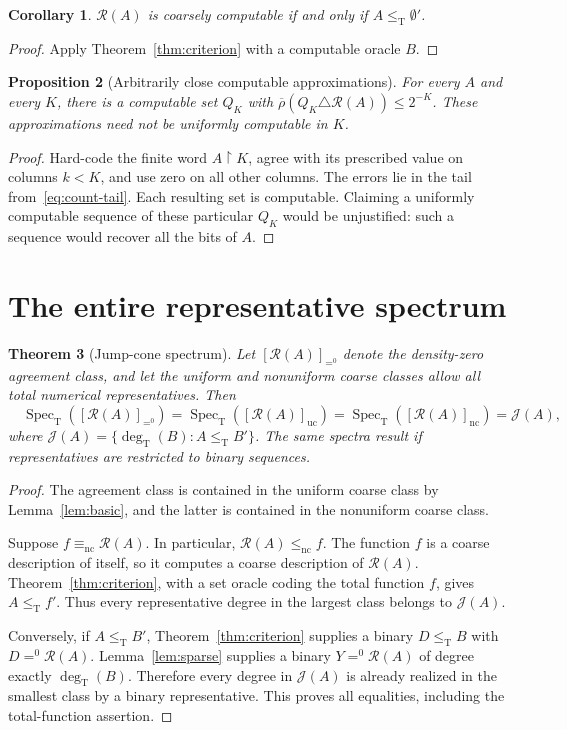 \documentclass[11pt,a4paper]{article}
\newcommand{\leT}{\leq_{\mathrm T}}
\newcommand{\lenc}{\leq_{\mathrm{nc}}}
\newcommand{\eqnc}{\equiv_{\mathrm{nc}}}
\newcommand{\az}{\mathrel{=^{0}}}
\newcommand{\Spec}{\operatorname{Spec}_{\mathrm T}}
\newcommand{\degT}{\operatorname{deg}_{\mathrm T}}
\newcommand{\R}{\mathcal R}
\newcommand{\J}{\mathcal J}
\newcommand{\pref}{\mathbin{\upharpoonright}}
\newtheorem{theorem}{Theorem}[section]
\newtheorem{proposition}[theorem]{Proposition}
\newtheorem{corollary}[theorem]{Corollary}
\theoremstyle{definition}\newtheorem{definition}[theorem]{Definition}
\theoremstyle{remark}\newtheorem{remark}[theorem]{Remark}
\begin{document}
\begin{corollary}\label{cor:noncoarse}
$\R(A)$ is coarsely computable if and only if $A\leT\emptyset'$.
\end{corollary}
\begin{proof}
Apply Theorem~\ref{thm:criterion} with a computable oracle $B$.
\end{proof}

\begin{proposition}[Arbitrarily close computable approximations]\label{prop:gamma}
For every $A$ and every $K$, there is a computable set $Q_K$ with
$\overline\rho(Q_K\triangle\R(A))\leq2^{-K}$. These approximations need not be uniformly computable in $K$.
\end{proposition}
\begin{proof}
Hard-code the finite word $A\pref K$, agree with its prescribed value on columns $k<K$, and use zero on all other columns. The errors lie in the tail from~\eqref{eq:count-tail}. Each resulting set is computable. Claiming a uniformly computable sequence of these particular $Q_K$ would be unjustified: such a sequence would recover all the bits of $A$.
\end{proof}

\section{The entire representative spectrum}
\label{sec:spectrum}
\begin{theorem}[Jump-cone spectrum]\label{thm:spectrum}
Let $[\R(A)]_{=^0}$ denote the density-zero agreement class, and let the uniform and nonuniform coarse classes allow all total numerical representatives. Then
\begin{equation}
 \boxed{\quad
 \Spec([\R(A)]_{=^0})
 =\Spec([\R(A)]_{\mathrm{uc}})
 =\Spec([\R(A)]_{\mathrm{nc}})
 =\J(A),\quad}
 \label{eq:full-spectrum}
\end{equation}
where $\J(A)=\{\degT(B):A\leT B'\}$. The same spectra result if representatives are restricted to binary sequences.
\end{theorem}
\begin{proof}
The agreement class is contained in the uniform coarse class by Lemma~\ref{lem:basic}, and the latter is contained in the nonuniform coarse class.

Suppose $f\eqnc\R(A)$. In particular, $\R(A)\lenc f$. The function $f$ is a coarse description of itself, so it computes a coarse description of $\R(A)$. Theorem~\ref{thm:criterion}, with a set oracle coding the total function $f$, gives $A\leT f'$. Thus every representative degree in the largest class belongs to $\J(A)$.

Conversely, if $A\leT B'$, Theorem~\ref{thm:criterion} supplies a binary $D\leT B$ with $D\az\R(A)$. Lemma~\ref{lem:sparse} supplies a binary $Y\az\R(A)$ of degree exactly $\degT(B)$. Therefore every degree in $\J(A)$ is already realized in the smallest class by a binary representative. This proves all equalities, including the total-function assertion.
\end{proof}
\end{document}
